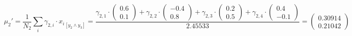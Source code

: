 \documentclass[12pt]{article}
\begin{document}
\begin{enumerate}[leftmargin=\labelsep]
          \begingroup
          \allowdisplaybreaks
          \begin{equation*}
              \mu_2' = \frac{1}{N_2} \sum_{i} \gamma_{2,i} \cdot {x_i}_{[y_2 \land y_3]}
                     = \frac{\gamma_{2,1} \cdot \begin{pmatrix} 0.6 \\ 0.1 \end{pmatrix}
                            + \gamma_{2,2} \cdot \begin{pmatrix} -0.4 \\ 0.8 \end{pmatrix}
                            + \gamma_{2,3} \cdot \begin{pmatrix} 0.2 \\ 0.5 \end{pmatrix}
                            + \gamma_{2,4} \cdot \begin{pmatrix} 0.4 \\ -0.1 \end{pmatrix}}{2.45533}
                     = \begin{pmatrix} 0.30914 \\ 0.21042 \end{pmatrix}
          \end{equation*}
          \endgroup


\end{enumerate}
\end{document}
